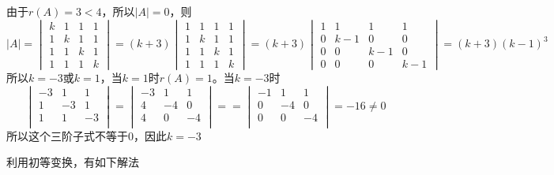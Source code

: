 \begin{solution}
    由于$r(A)=3<4$，所以$|A|=0$，则
    \[
        |A| =
        \begin{vmatrix}
            k & 1 & 1 & 1 \\
            1 & k & 1 & 1 \\
            1 & 1 & k & 1 \\
            1 & 1 & 1 & k
        \end{vmatrix}
        =(k+3)
        \begin{vmatrix}
            1 & 1 & 1 & 1 \\
            1 & k & 1 & 1 \\
            1 & 1 & k & 1 \\
            1 & 1 & 1 & k
        \end{vmatrix}
        =(k+3)
        \begin{vmatrix}
            1 & 1   & 1   & 1   \\
            0 & k-1 & 0   & 0   \\
            0 & 0   & k-1 & 0   \\
            0 & 0   & 0   & k-1
        \end{vmatrix}
        =(k+3)(k-1)^3
    \]
    所以$k=-3$或$k=1$，当$k=1$时$r(A)=1$。当$k=-3$时
    \[
        \begin{vmatrix}
            -3 & 1  & 1  \\
            1  & -3 & 1  \\
            1  & 1  & -3 \\
        \end{vmatrix}
        =
        \begin{vmatrix}
            -3 & 1  & 1  \\
            4  & -4 & 0  \\
            4  & 0  & -4 \\
        \end{vmatrix}
        =
        =
        \begin{vmatrix}
            -1 & 1  & 1  \\
            0  & -4 & 0  \\
            0  & 0  & -4 \\
        \end{vmatrix}
        =-16\neq 0
    \]
    所以这个三阶子式不等于$0$，因此$k=-3$
\end{solution}
利用初等变换，有如下解法
